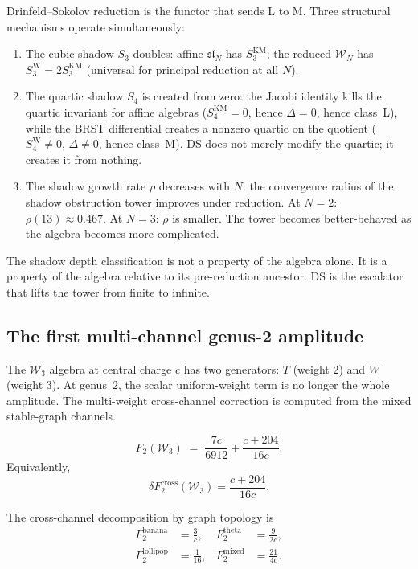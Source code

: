 \documentclass[11pt]{article}
\newcommand{\cW}{\mathcal{W}}
\newcommand{\fsl}{\mathfrak{sl}}
\begin{document}
Drinfeld--Sokolov reduction is the functor that sends L to M.
Three structural mechanisms operate simultaneously:
\begin{enumerate}[label=(\roman*),nosep]
\item The cubic shadow $S_3$ doubles: affine $\fsl_N$ has
  $S_3^{\mathrm{KM}}$; the reduced $\cW_N$ has
  $S_3^{\mathrm{W}} = 2 S_3^{\mathrm{KM}}$ (universal for
  principal reduction at all $N$).
\item The quartic shadow $S_4$ is created from zero: the Jacobi
  identity kills the quartic invariant for affine algebras
  ($S_4^{\mathrm{KM}} = 0$, hence $\Delta = 0$, hence class~L),
  while the BRST differential creates a nonzero quartic on the
  quotient ($S_4^{\mathrm{W}} \neq 0$, $\Delta \neq 0$, hence
  class~M).  DS does not merely modify the quartic; it creates it
  from nothing.
\item The shadow growth rate $\rho$ decreases with $N$: the
  convergence radius of the shadow obstruction tower improves under
  reduction.  At $N = 2$: $\rho(13) \approx 0.467$.  At
  $N = 3$: $\rho$ is smaller.  The tower becomes better-behaved
  as the algebra becomes more complicated.
\end{enumerate}

The shadow depth classification is not a property of the algebra
alone.  It is a property of the algebra relative to its
pre-reduction ancestor.  DS is the escalator that lifts the tower
from finite to infinite.


\subsection{The first multi-channel genus-2 amplitude}
\label{sec:genus2-w3}

The $\cW_3$ algebra at central charge $c$ has two generators:
$T$ (weight 2) and $W$ (weight 3).  At genus~$2$, the scalar
uniform-weight term is no longer the whole amplitude.  The
multi-weight cross-channel correction is computed from the
mixed stable-graph channels.

\begin{proposition}
\label{prop:f2-w3}
\[
F_2(\cW_3)
\;=\;
\frac{7c}{6912}+\frac{c+204}{16c}.
\]
Equivalently,
\[
\delta F_2^{\mathrm{cross}}(\cW_3)
=\frac{c+204}{16c}.
\]
\end{proposition}

The cross-channel decomposition by graph topology is
\begin{align*}
F_2^{\mathrm{banana}} &= \frac{3}{c}, &
F_2^{\mathrm{theta}} &= \frac{9}{2c}, \\
F_2^{\mathrm{lollipop}} &= \frac{1}{16}, &
F_2^{\mathrm{mixed}} &= \frac{21}{4c}.
\end{align*}
\end{document}
